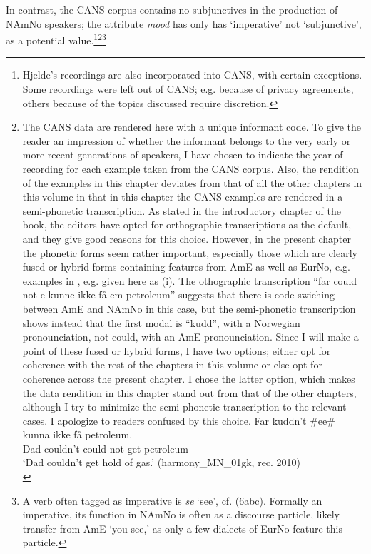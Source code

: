 \documentclass[output=paper]{langscibook}
\begin{document}
In contrast, the CANS corpus contains no subjunctives in the production of NAmNo speakers; the attribute \textit{mood}  has only has ‘imperative’ not ‘subjunctive’, as a potential value.\footnote{Hjelde’s recordings are also incorporated into CANS, with certain exceptions. Some recordings were left out of CANS; e.g. because of privacy agreements, others because of the topics discussed require discretion.}\footnote{The CANS data are rendered here with a unique informant code. To give the reader an impression of whether the informant belongs to the very early or more recent generations of speakers, I have chosen to indicate the year of recording for each example taken from the CANS corpus. Also, the rendition of the examples in this chapter deviates from that of all the other chapters in this volume in that in this chapter the CANS examples are rendered in a semi-phonetic transcription. As stated in the introductory chapter of the book, the editors have opted for orthographic transcriptions as the default, and they give good reasons for this choice. However, in the present chapter the phonetic forms seem rather important, especially those which are clearly fused or hybrid forms containing features from AmE as well as EurNo, e.g. examples in , e.g.  given here as (i). The othographic transcription “far could not e kunne ikke få em petroleum” suggests that there is code-swiching between AmE and NAmNo in this case, but the semi-phonetic transcription shows instead that the first modal is “kudd”, with a Norwegian pronounciation, not could, with an AmE pronounciation. Since I will make a point of these fused or hybrid forms, I have two options; either opt for coherence with the rest of the chapters in this volume or else opt for coherence across the present chapter. I chose the latter option, which makes the data rendition in this chapter stand out from that of the other chapters, although I try to minimize the semi-phonetic transcription to the relevant cases. I apologize to readers confused by this choice.   
\ea 
	\gll Far kuddn’t {\#ee\#} kunna ikke få petroleum.\\
	     Dad couldn’t   {}    could not get petroleum\\
    \glt ‘Dad couldn’t get hold of gas.’ (harmony\_MN\_01gk, rec. 2010)\\
\z}\footnote{A verb often tagged as imperative is \textit{se} ‘see', cf. (6abc). Formally an imperative, its function in NAmNo is often as a discourse particle, likely transfer from AmE ‘you see,’ as only a few dialects of EurNo feature this particle.}
\end{document}

